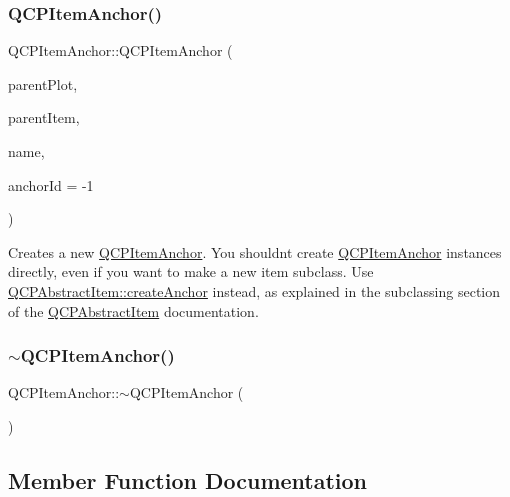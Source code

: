 \subsubsection{\texorpdfstring{Q\+C\+P\+Item\+Anchor()}{QCPItemAnchor()}}
{\footnotesize\ttfamily Q\+C\+P\+Item\+Anchor\+::\+Q\+C\+P\+Item\+Anchor (\begin{DoxyParamCaption}\item[{\hyperlink{class_q_custom_plot}{Q\+Custom\+Plot} $\ast$}]{parent\+Plot,  }\item[{\hyperlink{class_q_c_p_abstract_item}{Q\+C\+P\+Abstract\+Item} $\ast$}]{parent\+Item,  }\item[{const Q\+String \&}]{name,  }\item[{int}]{anchor\+Id = {\ttfamily -\/1} }\end{DoxyParamCaption})}

Creates a new \hyperlink{class_q_c_p_item_anchor}{Q\+C\+P\+Item\+Anchor}. You shouldn\textquotesingle{}t create \hyperlink{class_q_c_p_item_anchor}{Q\+C\+P\+Item\+Anchor} instances directly, even if you want to make a new item subclass. Use \hyperlink{class_q_c_p_abstract_item_af3fc92527802078ca395138748b629a7}{Q\+C\+P\+Abstract\+Item\+::create\+Anchor} instead, as explained in the subclassing section of the \hyperlink{class_q_c_p_abstract_item}{Q\+C\+P\+Abstract\+Item} documentation. \mbox{\label{class_q_c_p_item_anchor_a1868559407600688ee4d1a4621e81ceb}} 
\subsubsection{\texorpdfstring{$\sim$\+Q\+C\+P\+Item\+Anchor()}{~QCPItemAnchor()}}
{\footnotesize\ttfamily Q\+C\+P\+Item\+Anchor\+::$\sim$\+Q\+C\+P\+Item\+Anchor (\begin{DoxyParamCaption}{ }\end{DoxyParamCaption})\hspace{0.3cm}{\ttfamily [virtual]}}



\subsection{Member Function Documentation}
\mbox{\label{class_q_c_p_item_anchor_aef15daa640debfb11b0aeaa2116c6fbc}} 
